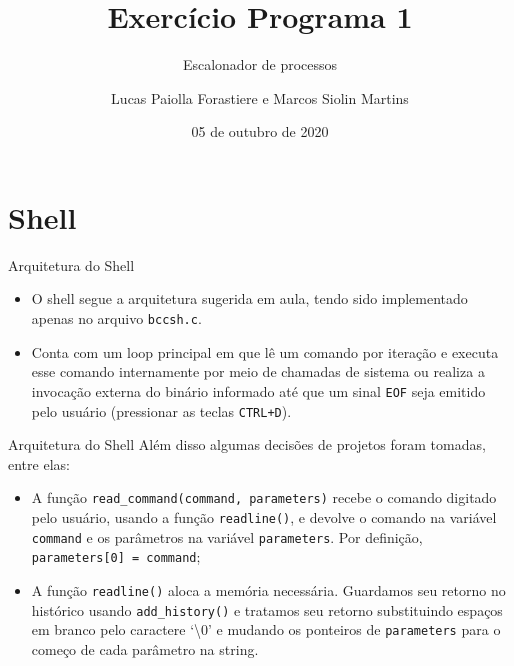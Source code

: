 \documentclass[10pt]{beamer}
\title{Exercício Programa 1}
\subtitle{Escalonador de processos}
\institute{IME-USP}
\author{Lucas Paiolla Forastiere e Marcos Siolin Martins}
\date{05 de outubro de 2020}
\begin{document}
    \maketitle
    \section{Shell}
    \begin{frame}{Arquitetura do Shell}
        \begin{itemize}
            \justifying
            \item O shell segue a arquitetura sugerida em aula, tendo sido implementado apenas no arquivo \texttt{bccsh.c}.

            \item Conta com um loop principal em que lê um comando por iteração e executa esse comando internamente por meio de chamadas de sistema ou realiza a invocação externa do binário informado até que um sinal \texttt{EOF} seja emitido pelo usuário (pressionar as teclas \texttt{CTRL+D}).
        \end{itemize}
    \end{frame}
    \begin{frame}{Arquitetura do Shell}
      Além disso algumas decisões de projetos foram tomadas, entre elas:
      \begin{itemize}
        \justifying
        \item A função \texttt{read\_command(command, parameters)} recebe o comando digitado pelo usuário, usando a função \texttt{readline()}, e devolve o comando na variável \texttt{command} e os parâmetros na variável \texttt{parameters}. Por definição, \texttt{parameters[0] = command};
        \item A função \texttt{readline()} aloca a memória necessária. Guardamos seu retorno no histórico usando \texttt{add\_history()} e tratamos seu retorno substituindo espaços em branco pelo caractere `\textbackslash 0' e mudando os ponteiros de \texttt{parameters} para o começo de cada parâmetro na string.
      \end{itemize}
    \end{frame}
\end{document}
